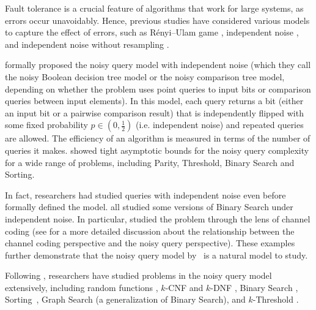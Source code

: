 
Fault tolerance is a crucial feature of algorithms that work for large systems, as errors occur unavoidably. Hence, previous studies have considered various models to capture the effect of errors, such as R{\'e}nyi--Ulam game \cite{renyi1961problem, ulam1976adventures}, independent noise \cite{feige1994computing}, and independent noise without resampling \cite{braverman2008noisy}.


\cite{feige1994computing} formally proposed the noisy query model with independent noise (which they call the noisy Boolean decision tree model or the noisy comparison tree model, depending on whether the problem uses point queries to input bits or comparison queries between input elements). In this model, each query returns a bit (either an input bit or a pairwise comparison result) that is independently flipped with some fixed probability $p \in (0, \frac{1}{2})$ (i.e. independent noise) and repeated queries are allowed. The efficiency of an algorithm is measured in terms of the number of queries it makes. \cite{feige1994computing}  showed tight asymptotic bounds for the noisy query complexity for a wide range of problems, including Parity, Threshold, Binary Search and Sorting.




In fact, researchers had studied queries with independent noise even before \cite{feige1994computing} formally defined the model. \cite{berlekamp1964block,horstein1963sequential,burnashev1974interval} all studied some versions of Binary Search under independent noise. In particular, \cite{berlekamp1964block,horstein1963sequential} studied the problem through the lens of channel coding (see \cite{wang2022noisy} for a more detailed discussion about the relationship between the channel coding perspective and the noisy query perspective). These examples further demonstrate that the noisy query model by~\cite{feige1994computing} is a natural model to study.

Following \cite{feige1994computing}, researchers have studied problems in the noisy query model extensively, including random functions \cite{reischuk1991reliable,feige1992complexity,evans1998average}, $k$-CNF and $k$-DNF \cite{DBLP:journals/rsa/KenyonK94}, Binary Search \cite{ben2008bayesian,dereniowski2021noisy, gu2023optimal, zhu2023optimal}, Sorting~\cite{wang2022noisy,wang2023variable,gu2023optimal, zhu2023optimal}, Graph Search \cite{Emamjomeh-Zadeh16, DereniowskiTUW19, dereniowski2021noisy} (a generalization of Binary Search), and $k$-Threshold \cite{zhu2023optimal, zhu2023noisy,wang2024noisy}.

